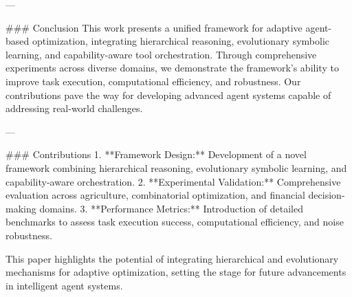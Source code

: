 ---

### Conclusion
This work presents a unified framework for adaptive agent-based optimization, integrating hierarchical reasoning, evolutionary symbolic learning, and capability-aware tool orchestration. Through comprehensive experiments across diverse domains, we demonstrate the framework's ability to improve task execution, computational efficiency, and robustness. Our contributions pave the way for developing advanced agent systems capable of addressing real-world challenges.

---

### Contributions
1. **Framework Design:** Development of a novel framework combining hierarchical reasoning, evolutionary symbolic learning, and capability-aware orchestration.
2. **Experimental Validation:** Comprehensive evaluation across agriculture, combinatorial optimization, and financial decision-making domains.
3. **Performance Metrics:** Introduction of detailed benchmarks to assess task execution success, computational efficiency, and noise robustness.

This paper highlights the potential of integrating hierarchical and evolutionary mechanisms for adaptive optimization, setting the stage for future advancements in intelligent agent systems.